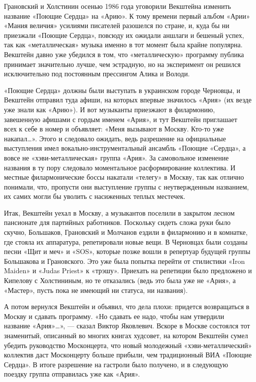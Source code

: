 \documentclass[10pt, twoside]{book}
\begin{document}
 Грановский и Холстинин осенью 1986 года уговорили Векштейна изменить название «Поющие Сердца» на «Арию». К
тому времени первый альбом «Арии» «Мания величия» усилиями писателей разошелся по стране, и, куда бы ни приезжали
«Поющие Сердца», повсюду их ожидали аншлаги и бешеный успех, так как «металлическая» музыка именно в тот момент была
крайне популярна. Векштейн давно уже убедился в том, что «металлическую» программу публика принимает значительно лучше,
чем эстрадную, но на эксперимент он решился исключительно под постоянным прессингом Алика и Володи.

«Поющие Сердца» должны были выступать в украинском городе Черновцы, и Векштейн отправил туда афиши, на которых впервые
значилось «Ария» (их везде уже знали как «Арию»). И вот музыканты приезжают в филармонию, завешенную афишами с гордым
именем «Ария», и тут Векштейн приглашает всех к себе в номер и объявляет: «Меня вызывают в Москву. Кто-то уже
накапал\ldots». Этого и следовало ожидать, ведь разрешение на официальные выступления имел вокально-инструментальный
ансамбль «Поющие «Сердца», а вовсе не «хэви-металлическая» группа «Ария». За самовольное изменение названия в ту пору
следовало моментальное расформирование коллектива. И местные филармонические боссы накатали «телегу» в Москву, так как
отлично понимали, что, пропусти они выступление группы с неутвержденным названием, их самих могли бы уволить с
насиженных теплых местечек.

Итак, Векштейн уехал в Москву, а музыкантов поселили в закрытом лесном пансионате для партийных работников. Поскольку
сидеть сложа руки было скучно, Большаков, Грановский и Молчанов ездили в филармонию и в комнатке, где стояла их
аппаратура, репетировали новые вещи. В Черновцах были созданы песни «Щит и меч» и «SOS», которые позже вошли в репертуар
будущей группы Большакова и Грановского. Это уже была попытка перейти от стилистики «Iron Maiden» и «Judas Priest» к
«трэшу». Приехать на репетиции было предложено и Кипелову с Холстининым, но те отказались (ведь это была уже не «Ария»,
а «Мастер», пусть пока не имеющий ни статуса, ни названия).

А потом вернулся Векштейн и объявил, что дела плохи: придется возвращаться в Москву и сдавать программу. «Но сдавать ее
надо, чтобы нам утвердили название «Ария»\ldots», — сказал Виктор Яковлевич. Вскоре в Москве состоялся тот знаменитый,
описанный во многих книгах худсовет, на котором Векштейн сумел убедить руководство Москонцерта, что новый молодежный
«хэви-металлический» коллектив даст Москонцерту больше прибыли, чем традиционный ВИА «Поющие Сердца». В итоге разрешение
на гастроли было получено, и в следующую поездку группа отправилась уже как «Ария».
\end{document}

